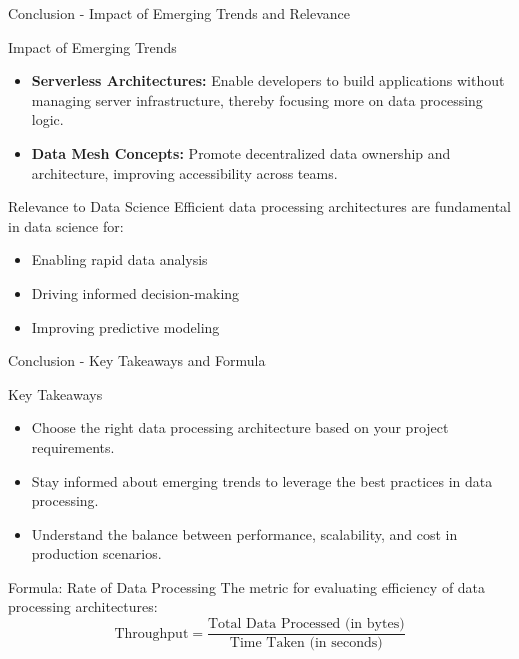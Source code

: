 \documentclass[aspectratio=169]{beamer}
\begin{document}
\begin{frame}[fragile]{Conclusion - Impact of Emerging Trends and Relevance}
  \begin{block}{Impact of Emerging Trends}
    \begin{itemize}
      \item \textbf{Serverless Architectures:} Enable developers to build applications without managing server infrastructure, thereby focusing more on data processing logic.
      \item \textbf{Data Mesh Concepts:} Promote decentralized data ownership and architecture, improving accessibility across teams.
    \end{itemize}
  \end{block}

  \begin{block}{Relevance to Data Science}
    Efficient data processing architectures are fundamental in data science for:
    \begin{itemize}
      \item Enabling rapid data analysis
      \item Driving informed decision-making
      \item Improving predictive modeling
    \end{itemize}
  \end{block}
\end{frame}

\begin{frame}[fragile]{Conclusion - Key Takeaways and Formula}
  \begin{block}{Key Takeaways}
    \begin{itemize}
      \item Choose the right data processing architecture based on your project requirements.
      \item Stay informed about emerging trends to leverage the best practices in data processing.
      \item Understand the balance between performance, scalability, and cost in production scenarios.
    \end{itemize}
  \end{block}

  \begin{block}{Formula: Rate of Data Processing}
    The metric for evaluating efficiency of data processing architectures:
    \begin{equation}
      \text{Throughput} = \frac{\text{Total Data Processed (in bytes)}}{\text{Time Taken (in seconds)}}
    \end{equation}
  \end{block}
\end{frame}
\end{document}
